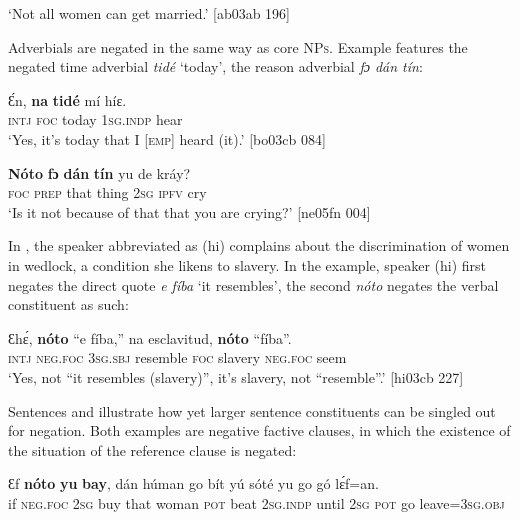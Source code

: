 \glt ‘Not all women can get married.’ [ab03ab 196]
\z

Adverbials are negated in the same way as core \textsc{NPs}. Example  features the negated time adverbial \textit{tidé} ‘today’,  the reason adverbial \textit{fɔ dán tín}: 


\ea%
    \label{ex:key:577}
    \gll Ɛ́n,  \textbf{na}  \textbf{tidé}    mí    híɛ.\\
\textsc{intj}  \textsc{foc}  today  \textsc{1sg.indp}  hear\\

\glt ‘Yes, it’s today that I \textsc{[emp]} heard (it).’ [bo03cb 084]
\z


\ea%
    \label{ex:key:578}
    \gll \textbf{Nóto}  \textbf{fɔ}  \textbf{dán}    \textbf{tín}    yu  de  kráy?\\
\textsc{foc}    \textsc{prep}  that    thing  \textsc{2sg}  \textsc{ipfv}  cry\\

\glt ‘Is it not because of that that you are crying?’ [ne05fn 004]
\z

In , the speaker abbreviated as (hi) complains about the discrimination of women in wedlock, a condition she likens to slavery. In the example, speaker (hi) first negates the direct quote\textit{ e fíba} ‘it resembles’, the second \textit{nóto} negates the verbal constituent as such: 


\ea%
    \label{ex:key:579}
    \gll Ɛhɛ́,    \textbf{nóto}    “e    fíba,”  na  esclavitud,  \textbf{nóto}  “fíba”.\\
\textsc{intj}    \textsc{neg}.\textsc{foc}  \textsc{3sg.sbj}  resemble    \textsc{foc}  slavery    \textsc{neg}.\textsc{foc}  seem\\

\glt ‘Yes, not “it resembles (slavery)”, it’s slavery, not “resemble”.’ [hi03cb 227]
\z

Sentences  and  illustrate how yet larger sentence constituents can be singled out for negation. Both examples are negative factive clauses, in which the existence of the situation of the reference clause is negated:


\ea%
    \label{ex:key:580}
    \gll Ɛf  \textbf{nóto}    \textbf{yu}  \textbf{bay},    dán  húman  go  bít  yú
sóté    yu  go  gó  lɛ́f=an.\\
if  \textsc{neg}.\textsc{foc}  \textsc{2sg}  buy    that  woman  \textsc{pot}  beat  \textsc{2sg.indp}
until  \textsc{2sg}  \textsc{pot}  go  leave=\textsc{3sg.obj}\\


